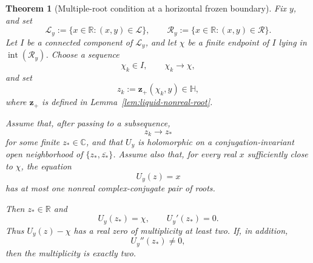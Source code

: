 \documentclass[11pt]{amsart}
\theoremstyle{plain}
\newtheorem{theorem}{Theorem}
\numberwithin{equation}{section}
\numberwithin{theorem}{section}
\numberwithin{figure}{section}
\begin{document}
\begin{theorem}[Multiple-root condition at a horizontal frozen boundary]
\label{t17}
Fix \(y\), and set
\[
    \mathcal L_y
    :=
    \{x\in\mathbb R:(x,y)\in\mathcal L\},
    \qquad
    \mathcal R_y
    :=
    \{x\in\mathbb R:(x,y)\in\mathcal R\}.
\]
Let \(I\) be a connected component of \(\mathcal L_y\), and let
\(\chi\) be a finite endpoint of \(I\) lying in
\(\operatorname{int}(\mathcal R_y)\). Choose a sequence
\[
    \chi_k\in I,
    \qquad
    \chi_k\longrightarrow\chi,
\]
and set
\[
    z_k:=\mathbf z_+(\chi_k,y)\in\mathbb H,
\]
where \(\mathbf z_+\) is defined in
Lemma~\ref{lem:liquid-nonreal-root}.

Assume that, after passing to a subsequence,
\[
    z_k\longrightarrow z_*
\]
for some finite \(z_*\in\mathbb C\), and that \(U_y\) is holomorphic on
a conjugation-invariant open neighborhood of
\(\{z_*,\overline{z_*}\}\). Assume also that, for every real \(x\)
sufficiently close to \(\chi\), the equation
\[
    U_y(z)=x
\]
has at most one nonreal complex-conjugate pair of roots.

Then \(z_*\in\mathbb R\) and
\[
    U_y(z_*)=\chi,
    \qquad
    U_y'(z_*)=0.
\]
Thus \(U_y(z)-\chi\) has a real zero of multiplicity at least two. If,
in addition,
\[
    U_y''(z_*)\neq0,
\]
then the multiplicity is exactly two.
\end{theorem}
\end{document}
